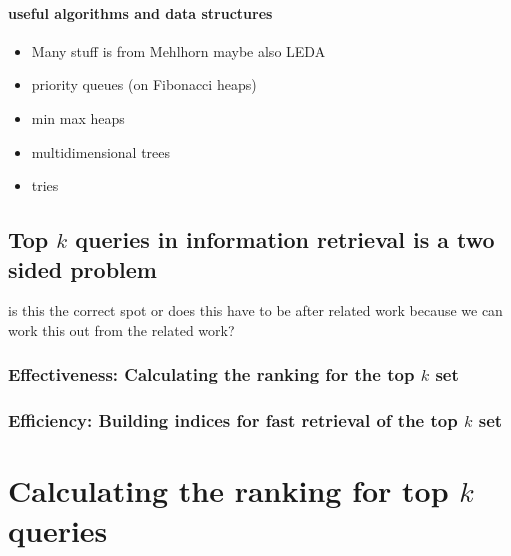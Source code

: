 \documentclass[•]{book}
\begin{document}
\subsection{useful algorithms and data structures}
\begin{itemize}
\item Many stuff is from Mehlhorn \cite{rw:algodat:Mehlhorn:1990} maybe also LEDA
\item priority queues (on Fibonacci heaps)
\item min max heaps
\item multidimensional trees
\item tries
\end{itemize}


\chapter{Top $k$ queries in information retrieval is a two sided problem}
is this the correct spot or does this have to be after related work because we can work this out from the related work?
\section{Effectiveness: Calculating the ranking for the top $k$ set}
\section{Efficiency: Building indices for fast retrieval of the top $k$ set}

\part{Calculating the ranking for top $k$ queries}

\end{document}
